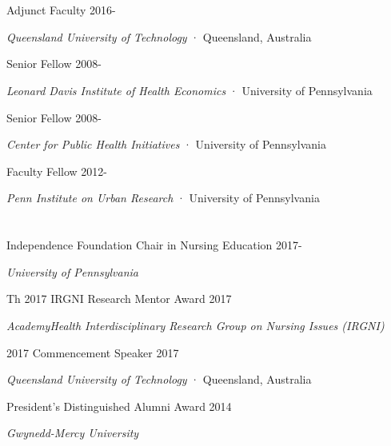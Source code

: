 \documentclass[10pt,]{article}
\begin{document}
{{{{{{{{{{{{{{\section{\Large {}}

Adjunct Faculty \hfill {2016-{\small{}}} \newline
\hspace*{0.5cm} {\textit {Queensland University of Technology} · Queensland, Australia

Senior Fellow  \hfill {2008-{\small{}}} \newline
\hspace*{0.5cm} {\textit {Leonard Davis Institute of Health Economics} · University of Pennsylvania

Senior Fellow  \hfill {2008-{\small{}}} \newline
\hspace*{0.5cm} {\textit {Center for Public Health Initiatives} · University of Pennsylvania

Faculty Fellow  \hfill {2012-{\small{}}} \newline
\hspace*{0.5cm} {\textit {Penn Institute on Urban Research} · University of Pennsylvania \newline

\section{\Large {}}

Independence Foundation Chair in Nursing Education \hfill {2017-{\small{}}} \newline
\hspace*{0.5cm} {\textit {University of Pennsylvania}

Th 2017 IRGNI Research Mentor Award  \hfill 2017	\newline
\hspace*{0.5cm} {\textit {AcademyHealth Interdisciplinary Research Group on Nursing Issues (IRGNI)} 

2017 Commencement Speaker \hfill 2017	\newline
\hspace*{0.5cm} {\textit {Queensland University of Technology} · Queensland, Australia

President's Distinguished Alumni Award \hfill 2014 \newline
\hspace*{0.5cm} {\textit {Gwynedd-Mercy University}

}}}}}}}}}}}}}}}}}}}}}}
\end{document}
